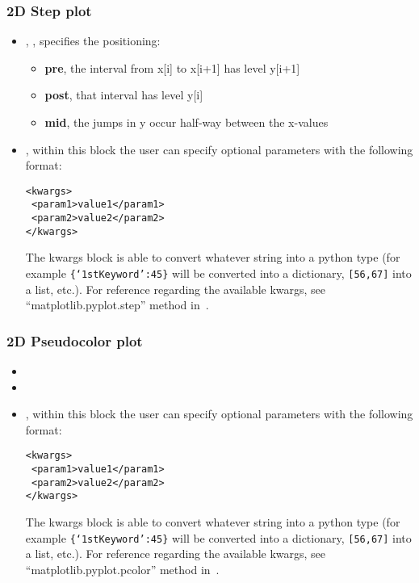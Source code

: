 \subsubsection{2D Step plot}
  \begin{itemize}
    \item {}, , specifies the 
    positioning:
    \begin{itemize}
      \item \textbf{pre}, the interval from x[i] to x[i+1] has level y[i+1]
      \item \textbf{post}, that interval has level y[i]
      \item \textbf{mid}, the jumps in y occur half-way between the x-values
    \end{itemize}
  \item {}, within this block the user can specify optional
  parameters with the following format:

\begin{lstlisting}[style=XML]
<kwargs>
 <param1>value1</param1>
 <param2>value2</param2>
</kwargs>
\end{lstlisting}

    The kwargs block is able to convert whatever string into a python type (for
    example \texttt{\{`1stKeyword':45\}} will
    be converted into a dictionary, 
    \texttt{[56,67]} into a list, etc.).
    For reference regarding the available kwargs, see ``matplotlib.pyplot.step''
    method in~\cite{MatPlotLib}.
  \end{itemize}

\subsubsection{2D Pseudocolor plot}
  \begin{itemize}
    \item \interpolationDescription[linear]
    \item {}
    \item {}, within this block the user can specify optional
    parameters with the following format:

\begin{lstlisting}[style=XML]
<kwargs>
 <param1>value1</param1>
 <param2>value2</param2>
</kwargs>
\end{lstlisting}

    The kwargs block is able to convert whatever string into a python type (for
    example \texttt{\{`1stKeyword':45\}} will
    be converted into a dictionary, 
    \texttt{[56,67]} into a list, etc.).
    For reference regarding the available kwargs, see 
    ``matplotlib.pyplot.pcolor'' method in~\cite{MatPlotLib}.
  \end{itemize}


